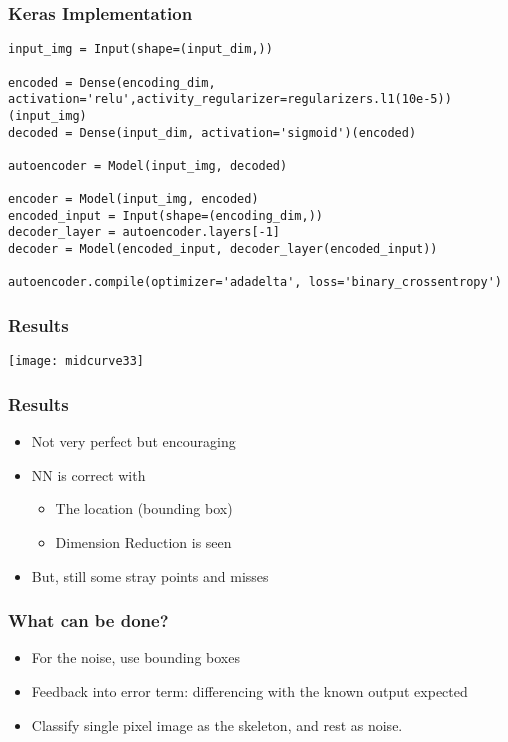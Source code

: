 \begin{frame}[fragile]\frametitle{Keras Implementation}

\begin{lstlisting}
input_img = Input(shape=(input_dim,))
    
encoded = Dense(encoding_dim, activation='relu',activity_regularizer=regularizers.l1(10e-5))(input_img)
decoded = Dense(input_dim, activation='sigmoid')(encoded) 
    
autoencoder = Model(input_img, decoded)
            
encoder = Model(input_img, encoded)
encoded_input = Input(shape=(encoding_dim,))
decoder_layer = autoencoder.layers[-1]
decoder = Model(encoded_input, decoder_layer(encoded_input))
    
autoencoder.compile(optimizer='adadelta', loss='binary_crossentropy')
\end{lstlisting}	
\end{frame}

\begin{frame}[fragile]\frametitle{Results}

\begin{center}
\texttt{[image: midcurve33]}
\end{center}	
\end{frame}

\begin{frame}[fragile]\frametitle{Results}
	\begin{itemize}
	\item Not very perfect but encouraging
	\item NN is correct with 
	\begin{itemize}
	\item The location (bounding box)
	\item Dimension Reduction is seen
	\end{itemize}	
	\item But, still some stray points and misses
	\end{itemize}	
\end{frame}

\begin{frame}[fragile]\frametitle{What can be done?}
	\begin{itemize}
	\item For the noise, use bounding boxes 
	\item Feedback into error term: differencing with the known output expected 
	\item Classify single pixel image as the skeleton, and rest as noise. 
	\end{itemize}	
\end{frame}

